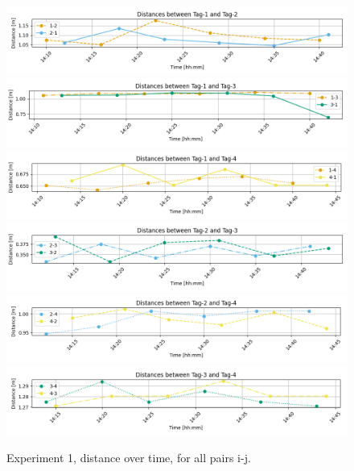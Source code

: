 \begin{figure}[ht!]
	\includegraphics[width=\linewidth]{graphics/exp/exp1_dist_data_plot_1_1_2_split.png}
	\includegraphics[width=\linewidth]{graphics/exp/exp1_dist_data_plot_1_1_3_split.png}
	\includegraphics[width=\linewidth]{graphics/exp/exp1_dist_data_plot_1_1_4_split.png}
	\includegraphics[width=\linewidth]{graphics/exp/exp1_dist_data_plot_1_2_3_split.png}
	\includegraphics[width=\linewidth]{graphics/exp/exp1_dist_data_plot_1_2_4_split.png}
	\includegraphics[width=\linewidth]{graphics/exp/exp1_dist_data_plot_1_3_4_split.png}
	\caption{Experiment 1, distance over time, for all pairs i-j.}
	\label{f:exp1_graphs_dist_split}
\end{figure}


